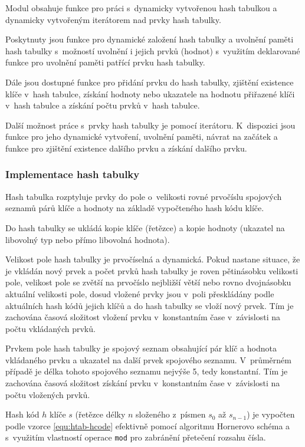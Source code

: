 \documentclass[a4paper, 12pt]{report}
\begin{document}
Modul obsahuje funkce pro práci s~dynamicky vytvořenou hash tabulkou a 
dynamicky vytvořeným iterátorem nad prvky hash tabulky.

Poskytnuty jsou funkce pro dynamické založení hash tabulky a uvolnění 
paměti hash tabulky s~možností uvolnění i jejich prvků (hodnot) s~využitím 
deklarované funkce pro uvolnění paměti patřící prvku hash tabulky.

Dále jsou dostupné funkce pro přidání prvku do hash tabulky, zjištění 
existence klíče v~hash tabulce, získání hodnoty nebo ukazatele na hodnotu 
přiřazené klíči v~hash tabulce a získání počtu prvků v~hash tabulce.

Další možnost práce s~prvky hash tabulky je pomocí iterátoru. K~dispozici 
jsou funkce pro jeho dynamické vytvoření, uvolnění paměti, návrat na 
začátek a funkce pro zjištění existence dalšího prvku a získání dalšího 
prvku.

\subsubsection{Implementace hash tabulky}

Hash tabulka rozptyluje prvky do pole o~velikosti rovné prvočíslu 
spojových seznamů párů klíče a hodnoty na základě vypočteného hash kódu 
klíče.

Do hash tabulky se ukládá kopie klíče (řetězce) a kopie hodnoty
(ukazatel na libovolný typ nebo přímo libovolná hodnota).

Velikost pole hash tabulky je prvočíselná a dynamická. Pokud nastane 
situace, že je vkládán nový prvek a počet prvků hash tabulky je roven 
pětinásobku velikosti pole, velikost pole se zvětší na prvočíslo nejbližší 
větší nebo rovno dvojnásobku aktuální velikosti pole, dosud vložené prvky 
jsou v~poli přeskládány podle aktuálních hash kódů jejich klíčů a do hash 
tabulky se vloží nový prvek. Tím je zachována časová složitost vložení 
prvku v~konstantním čase v~závislosti na počtu vkládaných prvků.

Prvkem pole hash tabulky je spojový seznam obsahující pár klíč a hodnota 
vkládaného prvku a ukazatel na další prvek spojového seznamu. V~průměrném 
případě je délka tohoto spojového seznamu nejvýše 5, tedy konstantní. Tím 
je zachována časová složitost získání prvku v~konstantním čase
v~závislosti na počtu vložených prvků.

Hash kód $h$ klíče $s$ (řetězce délky $n$ složeného z~písmen $s_0$ až 
$s_{n-1}$) je vypočten podle vzorce \ref{equ:htab-hcode} efektivně pomocí 
algoritmu Hornerovo schéma a s~využitím vlastností operace \texttt{mod} 
pro zabránění přetečení rozsahu čísla.
\end{document}
